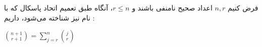 
\begin{fact}
  \p
  فرض کنیم
  $n,r$
  اعداد صحیح نامنفی باشند و
  $r \leq n$،
  آنگاه طبق تعمیم اتحاد پاسکال که با نام
  نیز شناخته می‌شود، داریم :
  \begin{center}
    $\binom{n+1}{r+1} = \sum\limits_{j=r}^n \binom{j}{r}$
  \end{center}
\end{fact}

